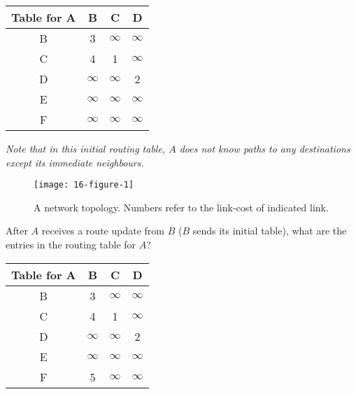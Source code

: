 \documentclass{supervision}
\begin{document}
\begin{questions}
\begin{parts}
          \begin{table}[h!]
            \centering
            \begin{tabular}{|c|ccc|}
              \hline
              Table for A & B        & C        & D        \\ \hline
              B           & 3        & $\infty$ & $\infty$ \\
              C           & 4        & 1        & $\infty$ \\
              D           & $\infty$ & $\infty$ & 2        \\
              E           & $\infty$ & $\infty$ & $\infty$ \\
              F           & $\infty$ & $\infty$ & $\infty$ \\ \hline
            \end{tabular}
          \end{table}

          \emph{Note that in this initial routing table, $A$ does not know paths
          to any destinations except its immediate neighbours.}

          \begin{figure}[h!]
            \caption{A network topology. Numbers refer to the link-cost of
              indicated link.}
            \label{fig:1}
            \centering
              \texttt{[image: 16-figure-1]}
          \end{figure}

          \begin{subparts}
            \subpart After $A$ receives a route update from $B$ ($B$ sends
              its initial table), what are the entries in the routing table
              for $A$?
              \begin{solution}
                \begin{center}
                  \begin{tabular}{|c|ccc|}
                    \hline
                    Table for A & B        & C        & D        \\ \hline
                    B           & 3        & $\infty$ & $\infty$ \\
                    C           & 4        & 1        & $\infty$ \\
                    D           & $\infty$ & $\infty$ & 2        \\
                    E           & $\infty$ & $\infty$ & $\infty$ \\
                    F           & 5        & $\infty$ & $\infty$ \\ \hline
                  \end{tabular}
                \end{center}
              \end{solution}


\end{subparts}
\end{parts}
\end{questions}
\end{document}
